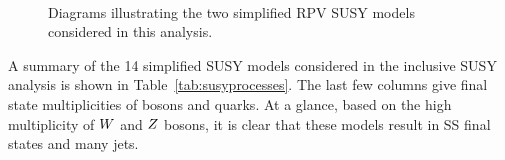 \begin{figure}[htb!]
    \centering
     \\
\caption{Diagrams illustrating the two simplified RPV SUSY models considered in this analysis.}
\label{fig:susy_diag_set3}
\end{figure}

A summary of the 14 simplified SUSY models considered in the inclusive SUSY analysis
is shown in Table~\ref{tab:susyprocesses}. The last few columns give final state multiplicities
of bosons and \PQb quarks. At a glance, based on the high multiplicity of $W$ and $Z$ bosons,
it is clear that these models result in SS final states and many jets.

